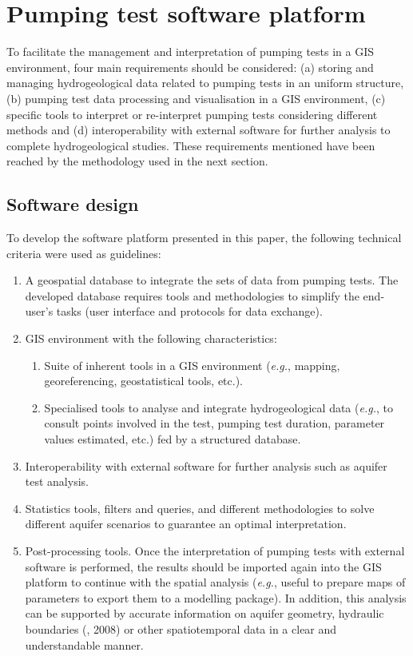 \section{Pumping test software platform} %
\label{section1.3}
To facilitate the management and interpretation of pumping tests in a GIS environment, four main requirements should be considered: (a) storing and managing hydrogeological data related to pumping tests in an uniform structure, (b) pumping test data processing and visualisation in a GIS environment, (c) specific tools to interpret or re-interpret pumping tests considering different methods and (d) interoperability with external software for further analysis to complete hydrogeological studies. These requirements mentioned have been reached by the methodology used in the next section.
\subsection{Software design}
To develop the software platform presented in this paper, the following technical criteria were used as guidelines:
\begin{enumerate}
\item A geospatial database to integrate the sets of data from pumping tests. The developed database requires tools and methodologies to simplify the end-user's tasks (user interface and protocols for data exchange).
\item  GIS environment with the following characteristics:
    \begin{enumerate}
    \item  Suite of inherent tools in a GIS environment (\textit{e.g.}, mapping, georeferencing, geostatistical tools, etc.).
    \item  Specialised tools to analyse and integrate hydrogeological data (\textit{e.g.}, to consult points involved in the test, pumping test duration, parameter values estimated, etc.) fed by a structured database.
    \end{enumerate}
\item  Interoperability with external software for further analysis such as aquifer test analysis.
\item  Statistics tools, filters and queries, and different methodologies to solve different aquifer scenarios to guarantee an optimal interpretation.
\item  Post-processing tools. Once the interpretation of pumping tests with external software is performed, the results should be imported again into the GIS platform to continue with the spatial analysis (\textit{e.g.}, useful to prepare maps of parameters to export them to a modelling package). In addition, this analysis can be supported by accurate information on aquifer geometry, hydraulic boundaries (\citeauthor{Cheong2008EstimatingKorea}, 2008) or other spatiotemporal data in a clear and understandable manner.
\end{enumerate}

